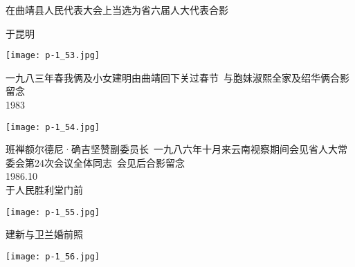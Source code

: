 \begin{tcolorbox}[notitle,grow to right by=1in,boxrule=0pt,colback=DarkRed,colframe=DarkRed]
    \fontsize{1cm}{0.9cm}\selectfont
    \raggedleft
    \noindent
    在曲靖县人民代表大会上当选为省六届人大代表合影\\
    \Large

    于昆明
\end{tcolorbox}
\begin{center}
    \texttt{[image: p-1\_53.jpg]}
\end{center}
\clearpage


\begin{tcolorbox}[notitle,grow to right by=1in,boxrule=0pt,colback=DarkRed,colframe=DarkRed]
    \fontsize{1cm}{0.9cm}\selectfont
    \raggedleft
    \noindent
    一九八三年春我俩及小女建明由曲靖回下关过春节~与胞妹淑熙全家及绍华俩合影留念\\
    \Large
    1983\\
    
\end{tcolorbox}
\begin{center}
    \texttt{[image: p-1\_54.jpg]}
\end{center}
\clearpage


\begin{tcolorbox}[notitle,grow to right by=1in,boxrule=0pt,colback=DarkRed,colframe=DarkRed]
    \fontsize{1cm}{0.9cm}\selectfont
    \raggedleft
    \noindent
    班禅额尔德尼·确吉坚赞副委员长~一九八六年十月来云南视察期间会见省人大常委会第24次会议全体同志~会见后合影留念\\
    \Large
    1986.10\\
    于人民胜利堂门前
\end{tcolorbox}
\begin{center}
    \texttt{[image: p-1\_55.jpg]}
\end{center}
\clearpage


\begin{tcolorbox}[notitle,grow to right by=1in,boxrule=0pt,colback=DarkRed,colframe=DarkRed]
    \fontsize{1cm}{0.9cm}\selectfont
    \raggedleft
    \noindent
    建新与卫兰婚前照\\
    \Large

    
\end{tcolorbox}
\begin{center}
    \texttt{[image: p-1\_56.jpg]}
\end{center}
\clearpage


